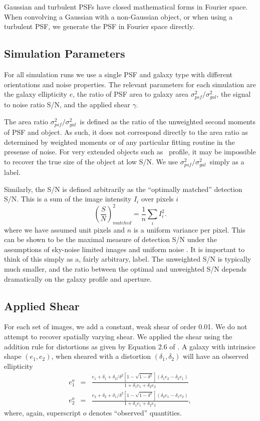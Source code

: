 \documentclass[12pt,preprint]{aastex}
\newcommand{\aratio}{\ensuremath{\sigma^2_{psf}/\sigma^2_{gal}}}
\begin{document}
Gaussian and turbulent PSFs have closed mathematical forms in Fourier space.
When convolving a Gaussian with a non-Gaussian object, or when using a
turbulent PSF, we generate the PSF in Fourier space directly.

\subsection{Simulation Parameters}

For all simulation runs we use a single PSF and galaxy type with different
orientations and noise properties.  The relevant parameters for each simulation
are the galaxy ellipticity $e$, the ratio of PSF area to galaxy area \aratio,
the signal to noise ratio S/N, and the applied shear $\gamma$.

The area ratio \aratio\ is defined as the ratio of the unweighted second
moments of PSF and object.  As such, it does not correspond directly to the
area ratio as determined by weighted moments or of any particular fitting
routine in the presense of noise.  For very extended objects such as \devauc\
profile, it may be impossible to recover the true size of the object at
low S/N.  We use \aratio\ simply as a label.

Similarly, the S/N is defined arbitrarily as the ``optimally matched''
detection S/N.  This is a sum of the image intensity $I_i$ over pixels $i$
\begin{equation}
\left(\frac{S}{N}\right)^2_{matched} = \frac{1}{n} \sum_{i} I_i^2.
\end{equation}
where we have assumed unit pixels and $n$ is a uniform variance per pixel.
This can be shown to be the maximal measure of detection S/N under the
assumptions of sky-noise limited images and uniform noise \citep{plazasthesis}.
It is important to think of this simply as a, fairly arbitrary, label.  The
unweighted S/N is typically much smaller, and the ratio between the optimal and
unweighted S/N depends dramatically on the galaxy profile and aperture.

\subsection{Applied Shear} \label{sec:sim:shear}

For each set of images, we add a constant, weak shear of order 0.01.  We do not
attempt to recover spatially varying shear.  We applied the shear using the
addition rule for distortions as given by Equation 2.6 of
\citet{Escude91}. A galaxy with intrinsice shape $(e_1,e_2)$, when
sheared with a distortion $(\delta_1, \delta_2)$ will have an observed
ellipticity
\begin{eqnarray}
e_1^o  & = & \frac
{e_1 + \delta_1 + \delta_2/\delta^2\left[1 - \sqrt{1-\delta^2}\right]\left( \delta_1 e_2 - \delta_2 e_1\right)}
{1 + \delta_1 e_1 + \delta_2 e_2 } \\
e_2^o  & = & \frac
{e_2 + \delta_2 + \delta_1/\delta^2\left[1 - \sqrt{1-\delta^2}\right]\left( \delta_2 e_1 - \delta_1 e_2\right)}
{1 + \delta_1 e_1 + \delta_2 e_2 },
\end{eqnarray}
where, again, superscript $o$ denotes ``observed'' quantities.
\end{document}

